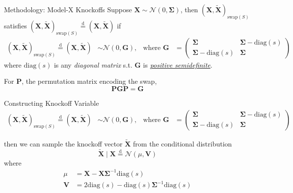     \begin{frame}{Methodology: Model-X Knockoffs}
        Suppose $\mathbf{X}\sim \mathcal{N}(0,\boldsymbol{\Sigma})$, then $(\mathbf{X},\tilde{\mathbf{X}})_{\mathrm{swap}(S)}$ satisfies $ (\mathbf{X},\tilde{\mathbf{X}})_{\mathrm{swap}(S)} \overset{\mathrm{d}}{=}(\mathbf{X},\tilde{\mathbf{X}}) $ if 
        \begin{align*}
            (\mathbf{X},\tilde{\mathbf{X}})_{\mathrm{swap}(S)} \overset{\mathrm{d}}{=}(\mathbf{X},\tilde{\mathbf{X}}) &\sim \mathcal{N}(0,\mathbf{G}), & \text{where } \mathbf{G}&=\begin{pmatrix}
                \boldsymbol{\Sigma} & \boldsymbol{\Sigma}-\mathrm{diag}(s)\\
                \boldsymbol{\Sigma}-\mathrm{diag}(s) & \boldsymbol{\Sigma}
            \end{pmatrix}
        \end{align*}
        where $\mathrm{diag}(s)$ is any \textit{diagonal matrix} s.t. $\boldsymbol{G}$ is \textit{\underline{positive semidefinite}}. 
        
        \vspace*{10pt}
        For $\mathbf{P}$, the permutation matrix encoding the swap,
        $$
        \mathbf{PGP} = \mathbf{G}
        $$
    \end{frame}

    \begin{frame}{Constructing Knockoff Variable}
        \begin{align*}
            (\mathbf{X},\tilde{\mathbf{X}})_{\mathrm{swap}(S)} \overset{\mathrm{d}}{=}(\mathbf{X},\tilde{\mathbf{X}}) &\sim \mathcal{N}(0,\mathbf{G}), & \text{where } \mathbf{G}&=\begin{pmatrix}
                \boldsymbol{\Sigma} & \boldsymbol{\Sigma}-\mathrm{diag}(s)\\
                \boldsymbol{\Sigma}-\mathrm{diag}(s) & \boldsymbol{\Sigma}
            \end{pmatrix}
        \end{align*}

        then we can sample the knockoff vector $\tilde{\mathbf{X}}$ from the conditional distribution
        $$
        \tilde{\mathbf{X}} \mid \mathbf{X} \overset{\mathrm{d}}{=}\mathcal{N}(\mu,\mathbf{V})
        $$
        where 
        \begin{align*}
            \mu &= \mathbf{X} - \mathbf{X}\boldsymbol{\Sigma}^{-1}\mathrm{diag}(s)\\
            \mathbf{V} &= 2\mathrm{diag}(s) - \mathrm{diag}(s)\boldsymbol{\Sigma}^{-1}\mathrm{diag}(s)
        \end{align*}

    \end{frame}

